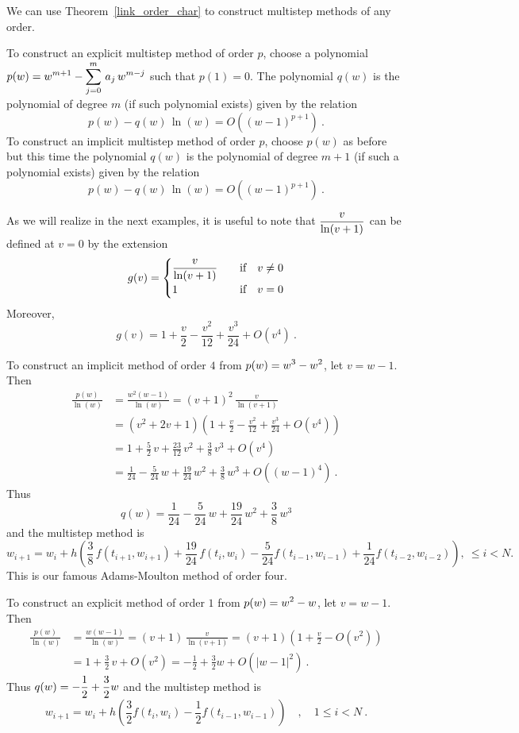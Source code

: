 We can use Theorem~\ref{link_order_char} to construct multistep
methods of any order.

To construct an explicit multistep method of order $p$, choose a
polynomial $\displaystyle p(w)= w^{m+1} - \sum_{j=0}^m\,a_j\,w^{m-j}$
such that $p(1)=0$.  The polynomial $q(w)$ is the polynomial of degree
$m$ (if such polynomial exists) given by the relation 
\[
p(w) - q(w)\,\ln(w) = O((w-1)^{p+1}) \ .
\]
To construct an implicit multistep method of order $p$, choose $p(w)$
as before but this time the polynomial $q(w)$ is the polynomial
of degree $m+1$ (if such a polynomial exists) given by the relation 
\[
p(w) - q(w)\,\ln(w) = O((w-1)^{p+1}) \ .
\]

As we will realize in the next examples, it is useful to note that
$\displaystyle \frac{v}{\ln(v+1)}$ can be defined at $v=0$ by the
extension
\[
g(v) = \begin{cases}
\displaystyle \frac{v}{\ln(v+1)} & \quad \text{if} \quad v \neq 0 \\
1 & \quad \text{if} \quad v = 0  
\end{cases}
\]
Moreover, 
\[
g(v) = 1 + \frac{v}{2} - \frac{v^2}{12} + \frac{v^3}{24} + O(v^4) \ .
\]

\begin{egg}
To construct an implicit method of order $4$ from
$\displaystyle p(w) = w^3- w^2$, let $v=w-1$.  Then
\begin{align*}
\frac{p(w)}{\ln(w)}
&= \frac{w^2(w-1)}{\ln(w)} = (v+1)^2\, \frac{v}{\ln(v+1)} \\
&= (v^2+2v+1)\left(1 + \frac{v}{2} - \frac{v^2}{12} + \frac{v^3}{24}
+ O(v^4) \right) \\
&= 1 + \frac{5}{2}\,v + \frac{23}{12}\,v^2 + \frac{3}{8} \, v^3
+ O(v^4) \\
&= \frac{1}{24} - \frac{5}{24}\,w + \frac{19}{24}\,w^2
+ \frac{3}{8} \, w^3 + O((w-1)^4) \ .
\end{align*}
Thus
\[
  q(w) = \frac{1}{24} - \frac{5}{24}\,w + \frac{19}{24}\,w^2
  + \frac{3}{8} \, w^3
\]
and the multistep method is
\[
w_{i+1} = w_i + h \left(
\frac{3}{8}\,f(t_{i+1},w_{i+1}) + \frac{19}{24}\,f(t_i,w_i)
-\frac{5}{24} f(t_{i-1},w_{i-1}) + \frac{1}{24}f(t_{i-2},w_{i-2}) \right)
, \ \leq i < N .
\]
This is our famous Adams-Moulton method of order four.
\end{egg}

\begin{egg}
To construct an explicit method of order $1$ from
$\displaystyle p(w) = w^2-w$, let $v=w-1$.  Then
\begin{align*}
\frac{p(w)}{\ln(w)} &= \frac{w(w-1)}{\ln(w)}
= (v+1)\, \frac{v}{\ln(v+1)}
= (v+1)\left(1 + \frac{v}{2} - O(v^2) \right) \\
&= 1 + \frac{3}{2}\,v + O(v^2)
= -\frac{1}{2} + \frac{3}{2} w + O(|w-1|^2) \ .
\end{align*}
Thus $\displaystyle q(w) = -\frac{1}{2} + \frac{3}{2} w$ and
the multistep method is
\[
w_{i+1} = w_i + h \left( \frac{3}{2} f(t_i,w_i)
-\frac{1}{2} f(t_{i-1},w_{i-1}) \right) \quad, \quad 1 \leq i < N \ .
\]
\end{egg}

